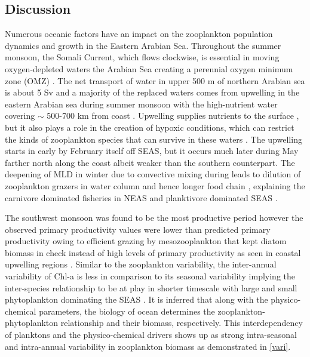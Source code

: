 \documentclass{article}
\begin{document}
	\subsection{Discussion}
	
	Numerous oceanic factors have an impact on the zooplankton population dynamics and growth in the Eastern Arabian Sea. Throughout the summer monsoon, the Somali Current, which flows clockwise, is essential in moving oxygen-depleted waters the Arabian Sea creating a perennial oxygen minimum zone (OMZ) \citep{sarma2020potential,sudheesh2022omz}. The net transport of water in upper 500 m of northern Arabian sea is about 5 Sv and a majority of the replaced waters comes from upwelling in the eastern Arabian sea \citep{shi1999remotely} during summer monsoon with the high-nutrient water covering $\sim$ 500-700 km from coast \citep{morrison1998seasonal}. Upwelling supplies nutrients to the surface \citep{Kumar.2000}, but it also plays a role in the creation of hypoxic conditions, which can restrict the kinds of zooplankton species that can survive in these waters \citep{jayakumar.2004}. The upwelling starts in early by February itself off SEAS, but it occurs much later during May farther north along the coast \citep{banse1968hydrography,Kumar.2000,vijith2016consequences,sarma2020potential} albeit weaker than the southern counterpart.
	The deepening of MLD in winter due to convective mixing during \citep{marra2005jgofs,shankar2016inhibition,shi2022phytoplankton} leads to dilution of zooplankton grazers in water column \citep{marra2005jgofs} and hence longer food chain \citep{banse1995zooplankton,barber2001qn}, explaining the carnivore dominated fisheries in NEAS \citep{shankar2019role} and planktivore dominated SEAS \citep{longhurst1990gd,shankar2019role}. 
	
	The southwest monsoon was found to be the most productive period \citep{Kumar.2000} however the observed primary productivity values were lower than predicted primary productivity owing to efficient grazing by mesozooplankton that kept diatom biomass in check instead of high levels of primary productivity as seen in coastal upwelling regions \citep{barber2001qn}. Similar to the zooplankton variability, the inter-annual variability of Chl-a is less in comparison to its seasonal variability \citep{shi2022phytoplankton} implying the inter-species relationship to be at play in shorter timescale with large and small phytoplankton dominating the SEAS \citep{shankar2019role}. It is inferred that along with the physico-chemical parameters, the biology of ocean determines the zooplankton-phytoplankton relationship and their biomass, respectively. This interdependency of planktons and the physico-chemical drivers shows up as strong intra-seasonal and intra-annual variability in zooplankton biomass as demonstrated in \autoref{vari}. 
	
\end{document}

